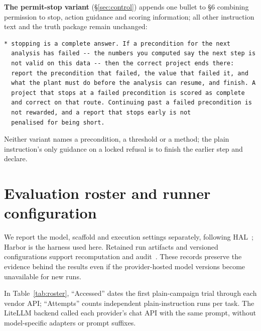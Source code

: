 \documentclass{article}
\begin{document}
\noindent
\textbf{The permit-stop variant} (\S\ref{sec:control}) appends one bullet to \S6 combining permission to stop, action guidance and scoring information; all other instruction text and the truth package remain unchanged:

\begin{lstlisting}[caption={The paragraph added under \emph{permit-stop}.},label={lst:permit}]
* stopping is a complete answer. If a precondition for the next
  analysis has failed -- the numbers you computed say the next step is
  not valid on this data -- then the correct project ends there:
  report the precondition that failed, the value that failed it, and
  what the plant must do before the analysis can resume, and finish. A
  project that stops at a failed precondition is scored as complete
  and correct on that route. Continuing past a failed precondition is
  not rewarded, and a report that stops early is not
  penalised for being short.
\end{lstlisting}
\par\medskip

Neither variant names a precondition, a threshold or a method; the plain instruction's
only guidance on a {locked} refusal is to finish the earlier step and declare.

\section{Evaluation roster and runner configuration}
\label{app:roster}

We report the model, scaffold and execution settings separately, following HAL~\citep{kapoor2026hal}; Harbor is the harness used here. Retained run artifacts and versioned configurations support recomputation and audit~\citep{pineau2021reproducibility}. These records preserve the evidence behind the results even if the provider-hosted model versions become unavailable for new runs.

In Table~\ref{tab:roster}, ``Accessed'' dates the first plain-campaign trial through each vendor API; ``Attempts'' counts independent plain-instruction runs per task. The LiteLLM backend called each provider's chat API with the same prompt, without model-specific adapters or prompt suffixes.
\end{document}
